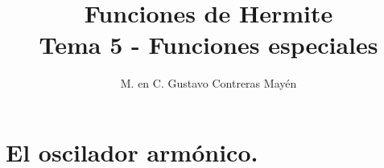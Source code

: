 
\title{Funciones de Hermite \\ \large {Tema 5 - Funciones especiales} \vspace{-3ex}}
\author{M. en C. Gustavo Contreras Mayén}
\date{ }

\pagestyle{fancy}
\fancyhf{}
\lhead{\leftmark}
\rfoot{\thepage}
\setlength{\headheight}{16pt}%

\def\changemargin#1#2{\list{}{\rightmargin#2\leftmargin#1}\item[]}
\let\endchangemargin=\endlist 



\maketitle
\fontsize{14}{14}\selectfont
\tableofcontents
\newpage


\section{El oscilador armónico.}

